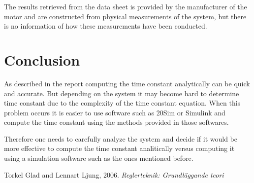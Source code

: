 \documentclass[12pt,a4paper]{article}
\begin{document}
The results retrieved from the data sheet is provided by the manufacturer of the motor and are constructed from physical measurements of the system, but there is no information of how these measurements have been conducted.

\section{Conclusion}
As described in the report computing the time constant analytically can be quick and accurate. But depending on the system it may become hard to determine time constant due to the complexity of the time constant equation. When this problem occurs it is easier to use software such as 20Sim or Simulink and compute the time constant using the methods provided in those softwares.

Therefore one needs to carefully analyze the system and decide if it would be more effective to compute the time constant analitically versus computing it using a simulation software such as the ones mentioned before.

\begin{thebibliography}{99}
 Torkel Glad and Lennart Ljung, 2006. \emph{Reglerteknik: Grundläggande teori}
\end{thebibliography}

\newpage
\appendix
\end{document}
